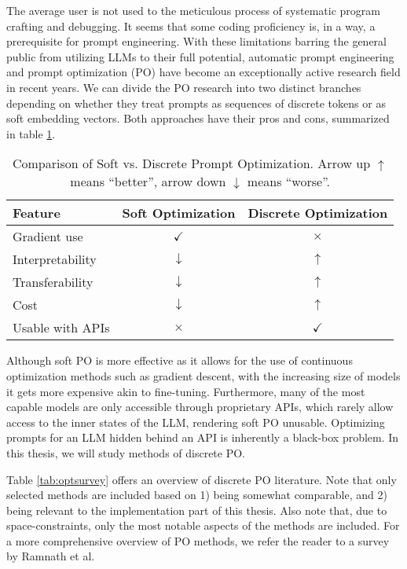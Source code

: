 The average user is not used to the meticulous process of systematic program crafting and debugging. It seems that
some coding proficiency is, in a way, a prerequisite for prompt engineering. With these limitations barring the general public from utilizing LLMs to their full potential,
automatic prompt engineering and prompt optimization (PO) have become an exceptionally active research field in recent years.
\newpage
We can divide the PO research into two distinct branches depending on whether 
they treat prompts as sequences of discrete tokens or as soft embedding vectors. 
Both approaches have their pros and cons, summarized in table \ref{tab:disxcont}.
\begin{table}[htbp]
    \centering
    \caption{Comparison of Soft vs. Discrete Prompt Optimization. Arrow up $\uparrow$ means ``better'', arrow down $\downarrow$ means ``worse''.}\label{tab:disxcont}
    \begin{tabular}{lcc}
    \toprule
    \textbf{Feature} & \textbf{Soft Optimization} & \textbf{Discrete Optimization} \\
    \midrule
    Gradient use      & $\checkmark$   & $\times$ \\
    Interpretability  & $\downarrow$ & $\uparrow$ \\
    Transferability  & $\downarrow$ & $\uparrow$ \\
    Cost  & $\downarrow$ & $\uparrow$ \\
    Usable with APIs  & $\times$   & $\checkmark$ \\
    \bottomrule
    \end{tabular}
    \end{table}

Although soft PO is more effective as it allows for the use of 
continuous optimization methods such as gradient descent, with the increasing size of models
it gets more expensive akin to fine-tuning. Furthermore, many of the most capable models are 
only accessible through proprietary APIs, which rarely allow access to the inner states of the LLM,
rendering soft PO unusable.
Optimizing prompts for an LLM hidden behind an API is inherently a black-box problem. 
In this thesis, we will study methods of discrete PO.

Table \ref{tab:optsurvey} offers an overview of discrete PO literature. Note that only selected methods are included 
based on 1) being somewhat comparable, and 2) being relevant to the implementation part of this thesis.
Also note that, due to space-constraints, only the most notable aspects of the methods are included. 
For a more comprehensive overview of PO methods, we refer the reader to a survey\cite{ramnath2025systematicsurveyautomaticprompt} by Ramnath et al.

